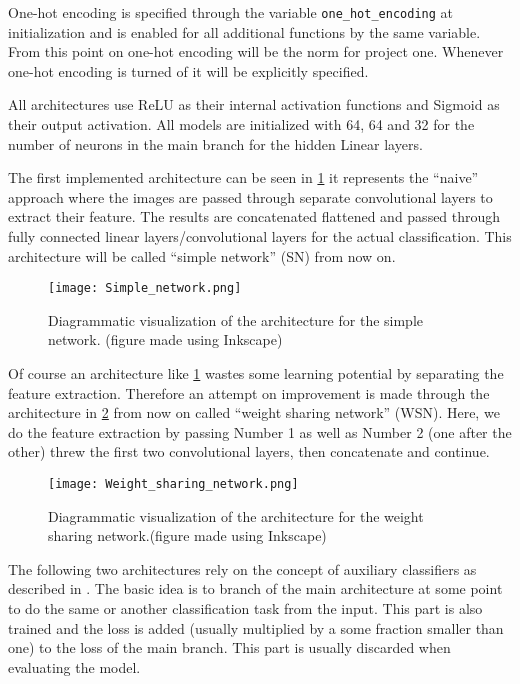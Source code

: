 \documentclass[11pt,english]{article}
\begin{document}
	One-hot encoding is specified through the variable \lstinline|one_hot_encoding| at initialization and is enabled for all additional functions by the same variable. From this point on one-hot encoding will be the norm for project one. Whenever one-hot encoding is turned of it will be explicitly specified.
	
	All architectures use ReLU as their internal activation functions and Sigmoid as their output activation. All models are initialized with 64, 64 and 32 for the number of neurons in the main branch for the hidden Linear layers.
	
	The first implemented architecture can be seen in \cref{fig:sn} it represents the ``naive'' approach where the images are passed through separate convolutional layers to extract their feature. The results are concatenated flattened and passed through fully connected linear layers/convolutional layers for the actual classification. This architecture will be called ``simple network'' (SN) from now on.
	
	\begin{figure}[H]
		\centering
		\texttt{[image: Simple\_network.png]}
		\caption{Diagrammatic visualization of the architecture for the simple network. (figure made using Inkscape)}
		\label{fig:sn}
	\end{figure}

	Of course an architecture like \cref{fig:sn} wastes some learning potential by separating the feature extraction. Therefore an attempt on improvement is made through the architecture in \cref{fig:ws} from now on called ``weight sharing network'' (WSN). Here, we do the feature extraction by passing Number 1 as well as Number 2 (one after the other) threw the first two convolutional layers, then concatenate and continue.
	
	\begin{figure}[H]
		\centering
		\texttt{[image: Weight\_sharing\_network.png]}
		\caption{Diagrammatic visualization of the architecture for the weight sharing network.(figure made using Inkscape)}
		\label{fig:ws}
	\end{figure}

	The following two architectures rely on the concept of auxiliary classifiers as described in \cite{Szegedy2014}. The basic idea is to branch of the main architecture at some point to do the same or another classification task from the input. This part is also trained and the loss is added (usually multiplied by a some fraction smaller than one) to the loss of the main branch. This part is usually discarded when evaluating the model.
	
\end{document}
